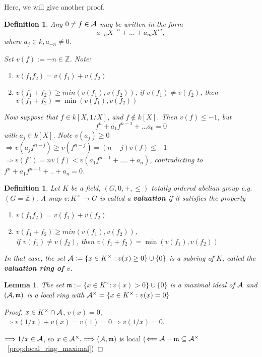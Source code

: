 \documentclass[11pt]{article}
\newtheorem{lemma}[thm]{Lemma}
\newtheorem{dfn}[thm]{Definition}
\newcommand{\intg}{\mathbb Z}
\newcommand{\scm}{{\mathfrak m}}
\newcommand{\cala}{{\cal A}}
\newcommand{\Lrta}{\Longrightarrow}
\newcommand{\lrta}{\longrightarrow}
\newcommand{\Llta}{\Longleftarrow}
\begin{document}
Here, we will give another proof.
\begin{dfn}
Any $0\neq f\in\cala$ may be written in the form
$$
a_{-n}X^{-n}+...+a_m X^{m},
$$
where $a_j\in k, a_{-n}\neq 0$.

Set $v(f):={-n}\in \intg$.
Note:
\begin{enumerate}
\item 
$
v(f_1f_2)=v(f_1)+v(f_2)
$
\item $v(f_1+f_2)\geq min(v(f_1),v(f_2))$, if $v(f_1)\neq v(f_2)$, then $v(f_1+f_2)=\min (v(f_1),v(f_2))$
\end{enumerate}

Now suppose that $f\in k[X,1/X]$, and $f\notin k[X]$. Then $v(f)\leq -1$, but 
$$
f^n+a_1 f^{n-1}+...a_0=0
$$
with $a_{j}\in k[X]$. Note $v(a_j)\geq 0$\\
$\Lrta v(a_j f^{n-j})\geq v(f^{n-j})=(n-j)v(f)\leq -1$\\
$\Lrta v(f^n)=nv(f)< v(a_1 f^{n-1}+....+a_n)$, contradicting to $f^n+a_1 f^{n-1}+..+a_n=0$.
\end{dfn}

\begin{dfn}
Let $K$ be a field, $(G,0, +,\leq)$ totally ordered abelian group e.g. $( G=\intg)$. A map $v:K^\times\lrta G$ is called a \textbf{valuation} if it satisfies the property
\begin{enumerate}
\item 
$
v(f_1f_2)=v(f_1)+v(f_2)
$
\item $v(f_1+f_2)\geq min(v(f_1),v(f_2))$,\\ if $v(f_1)\neq v(f_2)$, then $v(f_1+f_2)=\min (v(f_1),v(f_2))$
\end{enumerate}
In that case, the set $\cala:=\{x\in K^\times:v(x)\geq 0\}\cup \{0\}$ is a subring of $K$, called the \textbf{valuation ring of $v$}.
\end{dfn}

\begin{lemma}
The set $\scm:=\{x\in K^\times:v(x)> 0\}\cup \{0\}$ is a maximal ideal of $\cala$ and $(\cala,\scm)$ is a local ring with $\cala^\times=\{x\in K^\times:v(x)=0\}$
\end{lemma}
\begin{proof}
$x\in K^\times \cap \cala$, $v(x)=0$, $\Lrta v(1/x)+v(x)=v(1)=0\Lrta v(1/x)=0$.

$\Lrta 1/x\in \cala$, so $x\in \cala^\times.\Lrta (\cala,\scm)$ is local ($\Llta \cala-\scm\subseteq\cala^\times$~\ref{prop:local_ring_maximal})

\end{proof}
\end{document}
